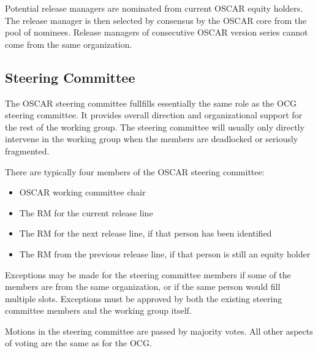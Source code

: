 Potential release managers are nominated from current OSCAR equity
holders.  The release manager is then selected by consensus by the
OSCAR core from the pool of nominees.  Release managers of consecutive
OSCAR version series cannot come from the same organization.


\subsection{Steering Committee}

The OSCAR steering committee fullfills essentially the same role as
the OCG steering committee.  It provides overall direction and
organizational support for the rest of the working group.  The
steering committee will usually only directly intervene in the working
group when the members are deadlocked or seriously fragmented. 

There are typically four members of the OSCAR steering committee:

\begin{itemize}
\item OSCAR working committee chair
\item The RM for the current release line
\item The RM for the next release line, if that person has been
  identified
\item The RM from the previous release line, if that person is still
  an equity holder
\end{itemize}

Exceptions may be made for the steering committee members if some of
the members are from the same organization, or if the same person
would fill multiple slots.  Exceptions must be approved by both the
existing steering committee members and the working group itself.

Motions in the steering committee are passed by majority votes.  All
other aspects of voting are the same as for the OCG.

